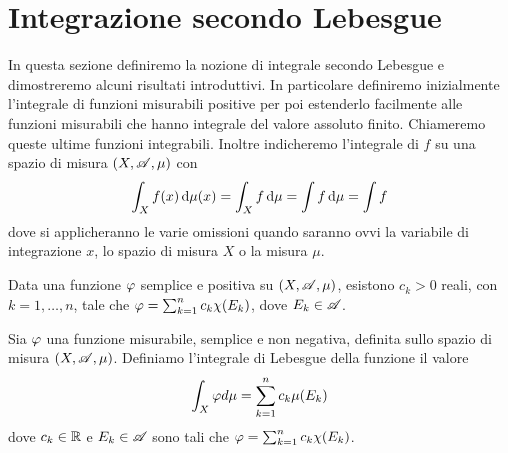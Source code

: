 \section{Integrazione secondo Lebesgue}
In questa sezione definiremo la nozione di integrale secondo Lebesgue e dimostreremo alcuni risultati introduttivi. In particolare definiremo inizialmente l'integrale di funzioni misurabili positive per poi estenderlo facilmente alle funzioni misurabili che hanno integrale del valore assoluto finito. Chiameremo queste ultime funzioni integrabili. Inoltre indicheremo l'integrale di $f$ su una spazio di misura $(X,\mathscr A,\mu)$ con 
\begin{equation*}
	\int_X f(x) \,\mathrm d \mu(x)=\int_X f \,\mathrm d \mu=\int f \,\mathrm d \mu=\int f
\end{equation*}
dove si applicheranno le varie omissioni quando saranno ovvi la variabile di integrazione $x$, lo spazio di misura $X$ o la misura $\mu$.

\begin{lemma}
	Data una funzione $\varphi$ semplice e positiva su $(X,\mathscr A,\mu)$, esistono $c_k>0$ reali, con $k=1,\dots, n$, tale che $\varphi=\sum_{k=1}^nc_k\chi(E_k)$, dove $E_k\in \mathscr A$.
\end{lemma}


\begin{definition}
	Sia $\varphi$ una funzione misurabile, semplice e non negativa, definita sullo spazio di misura $(X,\mathscr A,\mu)$. Definiamo l'integrale di Lebesgue della funzione il valore
	\begin{equation*}
		\int_X \varphi d \mu = \sum_{k=1}^n c_k\mu(E_k)
	\end{equation*}
	dove $c_k\in \mathbb R$ e $E_k \in \mathscr A$ sono tali che $\varphi=\sum_{k=1}^nc_k\chi(E_k)$.
\end{definition}

